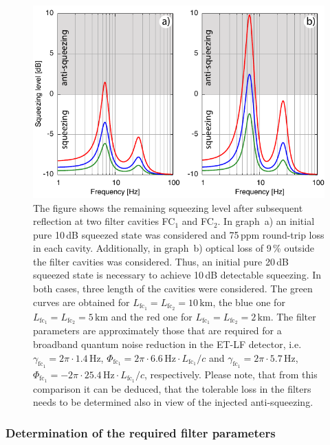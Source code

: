 \begin{figure}
\centering
\includegraphics[scale = 1.2] {./Sec_Optics/ET-C-FiltersAI.pdf}
\caption{The figure shows the remaining squeezing level after subsequent reflection at two filter cavities FC$_1$ and FC$_2$. In graph~a) an initial pure 10\,dB squeezed state was considered and 75\,ppm round-trip loss in each cavity. Additionally, in graph~b)  optical loss of 9\,\% outside the filter cavities was considered. Thus, an initial pure 20\,dB squeezed state is necessary to achieve 10\,dB detectable squeezing. In both cases, three length of the cavities were considered. The green curves are obtained for $L_{\text{fc}_1}=L_{\text{fc}_2}=10\,\mathrm{km}$, the blue one for  $L_{\text{fc}_1}=L_{\text{fc}_2}=5\,\mathrm{km}$ and the red one for  $L_{\text{fc}_1}=L_{\text{fc}_2}=2\,\mathrm{km}$. The filter parameters are approximately those that are required for a broadband quantum noise reduction in the ET-LF detector, i.e.\ $\gamma_{\text{fc}_1}=2\pi\cdot1.4\,\mathrm{Hz}$, $\Phi_{\text{fc}_1}= 2\pi\cdot6.6\,\mathrm{Hz}\cdot L_{\text{fc}_1}/c$ and $\gamma_{\text{fc}_1}=2\pi\cdot5.7\,\mathrm{Hz}$, $\Phi_{\text{fc}_1}= -2\pi\cdot25.4\,\mathrm{Hz}\cdot L_{\text{fc}_1}/c$, respectively. Please note, that from this comparison it can be deduced, that the tolerable loss in the filters needs to be determined also in view of the injected anti-squeezing.}
\label{app:fig:sqz}
\end{figure}
\FloatBarrier
\subsubsection{Determination of the required filter parameters}\label{app:detfcparams}

